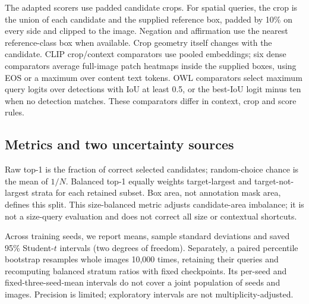 \documentclass[10pt,twocolumn,letterpaper]{article}
\begin{document}
The adapted scorers use padded candidate crops. For spatial queries, the crop is the union of each candidate and the supplied reference box, padded by 10\% on every side and clipped to the image. Negation and affirmation use the nearest reference-class box when available. Crop geometry itself changes with the candidate. CLIP crop/context comparators use pooled embeddings; six dense comparators average full-image patch heatmaps inside the supplied boxes, using EOS or a maximum over content text tokens. OWL comparators select maximum query logits over detections with IoU at least 0.5, or the best-IoU logit minus ten when no detection matches. These comparators differ in context, crop and score rules.

\subsection{Metrics and two uncertainty sources}
Raw top-1 is the fraction of correct selected candidates; random-choice chance is the mean of $1/N$. Balanced top-1 equally weights target-largest and target-not-largest strata for each retained subset. Box area, not annotation mask area, defines this split. This size-balanced metric adjusts candidate-area imbalance; it is not a size-query evaluation and does not correct all size or contextual shortcuts.

Across training seeds, we report means, sample standard deviations and saved 95\% Student-$t$ intervals (two degrees of freedom). Separately, a paired percentile bootstrap resamples whole images 10,000 times, retaining their queries and recomputing balanced stratum ratios with fixed checkpoints. Its per-seed and fixed-three-seed-mean intervals do not cover a joint population of seeds and images. Precision is limited; exploratory intervals are not multiplicity-adjusted.
\clearpage

\end{document}
